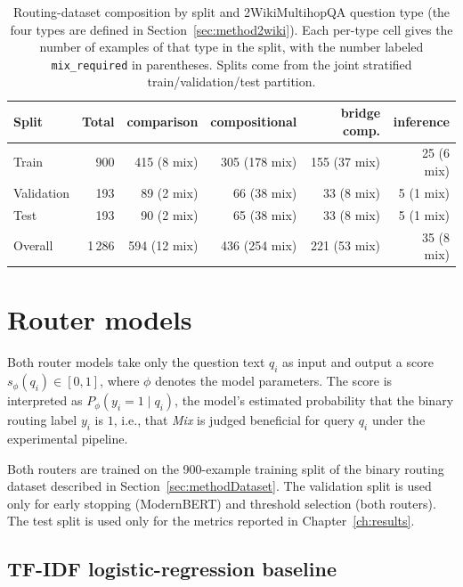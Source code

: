 \documentclass[english, bibtex]{kththesis}               %
\numberwithin{listing}{chapter}
\begin{document}
\begin{table}[!ht]
\begin{center}
\caption{Routing-dataset composition by split and 2WikiMultihopQA question type (the four types are defined in Section~\ref{sec:method2wiki}). Each per-type cell gives the number of examples of that type in the split, with the number labeled \texttt{mix\_required} in parentheses. Splits come from the joint stratified train/validation/test partition.}
\label{tab:datasetSummary}
\small
\setlength{\tabcolsep}{3pt}
\begin{tabular}{l|r|rrrr}
\textbf{Split} & \textbf{Total} & \textbf{comparison} & \textbf{compositional} & \textbf{bridge comp.} & \textbf{inference} \\
\hline
Train & 900 & 415 (8 mix) & 305 (178 mix) & 155 (37 mix) & 25 (6 mix) \\
Validation & 193 & 89 (2 mix) & 66 (38 mix) & 33 (8 mix) & 5 (1 mix) \\
Test & 193 & 90 (2 mix) & 65 (38 mix) & 33 (8 mix) & 5 (1 mix) \\
\hline
Overall & 1\,286 & 594 (12 mix) & 436 (254 mix) & 221 (53 mix) & 35 (8 mix) \\
\end{tabular}
\end{center}
\end{table}

\section{Router models}
\label{sec:methodRouters}

Both router models take only the question text $q_i$ as input and output a score \(s_\phi(q_i) \in [0,1]\), where $\phi$ denotes the model parameters. The score is interpreted as $P_\phi(y_i = 1 \mid q_i)$, the model's estimated probability that the binary routing label $y_i$ is $1$, i.e., that \emph{Mix} is judged beneficial for query $q_i$ under the experimental pipeline.

Both routers are trained on the 900-example training split of the binary routing dataset described in Section~\ref{sec:methodDataset}. The validation split is used only for early stopping (ModernBERT) and threshold selection (both routers). The test split is used only for the metrics reported in Chapter~\ref{ch:results}.

\subsection{TF-IDF logistic-regression baseline}
\label{sec:methodTfidf}
\end{document}
